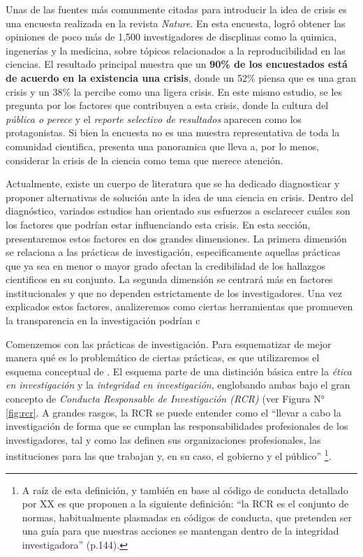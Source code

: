 \documentclass[
]{book}
\begin{document}
Unas de las fuentes más comunmente citadas para introducir la idea de crisis es una encuesta realizada en la revista \emph{Nature}. En esta encuesta, \citet{baker_500_2016} logró obtener las opiniones de poco más de 1,500 investigadores de discplinas como la quimica, ingenerías y la medicina, sobre tópicos relacionados a la reproducibilidad en las ciencias. El resultado principal muestra que un \textbf{90\% de los encuestados está de acuerdo en la existencia una crisis}, donde un 52\% piensa que es una gran crisis y un 38\% la percibe como una ligera crisis. En este mismo estudio, se les pregunta por los factores que contribuyen a esta crisis, donde la cultura del \emph{pública o perece} y el \emph{reporte selectivo de resultados} aparecen como los protagonistas. Si bien la encuesta no es una muestra representativa de toda la comunidad cientifica, presenta una panoramica que lleva a, por lo menos, considerar la crisis de la ciencia como tema que merece atención.

Actualmente, existe un cuerpo de literatura que se ha dedicado diagnosticar y proponer alternativas de solución ante la idea de una ciencia en crisis. Dentro del diagnóstico, variados estudios han orientado sus esfuerzos a esclarecer cuáles son los factores que podrían estar influenciando esta crisis. En esta sección, presentaremos estos factores en dos grandes dimensiones. La primera dimensión se relaciona a las prácticas de investigación, especificamente aquellas prácticas que ya sea en menor o mayor grado afectan la credibilidad de los hallazgos cientificos en su conjunto. La segunda dimensión se centrará más en factores institucionales y que no dependen estrictamente de los investigadores. Una vez explicados estos factores, analizeremos como ciertas herramientas que promueven la transparencia en la investigación podrían c

Comenzemos con las prácticas de investigación. Para esquematizar de mejor manera qué es lo problemático de ciertas prácticas, es que utilizaremos el esquema conceptual de \citet{steneck_Fostering_2006}. El esquema parte de una distinción básica entre la \emph{ética en investigación} y la \emph{integridad en investigación}, englobando ambas bajo el gran concepto de \emph{Conducta Responsable de Investigación (RCR)} (ver Figura N° \ref{fig:rcr}. A grandes rasgos, la RCR se puede entender como el ``llevar a cabo la investigación de forma que se cumplan las responsabilidades profesionales de los investigadores, tal y como las definen sus organizaciones profesionales, las instituciones para las que trabajan y, en su caso, el gobierno y el público'' \citep{steneck_Fostering_2006}\footnote{A raíz de esta definición, y también en base al código de conducta detallado por XX es que \citet{abrilruiz_Manzanas_2019} proponen a la siguiente definición: ``la RCR es el conjunto de normas, habitualmente plasmadas en códigos de conducta, que pretenden ser una guía para que nuestras acciones se mantengan dentro de la integridad investigadora'' (p.144).}.
\end{document}
